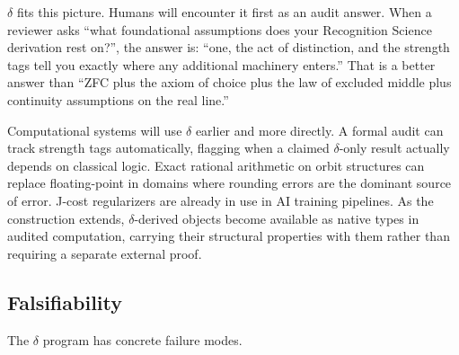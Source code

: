 \documentclass[11pt,a4paper]{article}
\theoremstyle{definition}
\theoremstyle{remark}
\begin{document}
$\delta$ fits this picture. Humans will encounter it first as an audit
answer. When a reviewer asks ``what foundational assumptions does your
Recognition Science derivation rest on?'', the answer is: ``one, the act of
distinction, and the strength tags tell you exactly where any additional
machinery enters.'' That is a better answer than ``ZFC plus the axiom of
choice plus the law of excluded middle plus continuity assumptions on the
real line.''

Computational systems will use $\delta$ earlier and more directly. A formal
audit can track strength tags automatically, flagging when a claimed
$\delta$-only result actually depends on classical logic. Exact rational arithmetic on
orbit structures can replace floating-point in domains where rounding errors
are the dominant source of error. J-cost regularizers are already in use in
AI training pipelines. As the construction extends, $\delta$-derived objects
become available as native types in audited computation, carrying their
structural properties with them rather than requiring a separate external
proof.

\subsection{Falsifiability}

The $\delta$ program has concrete failure modes.
\end{document}
